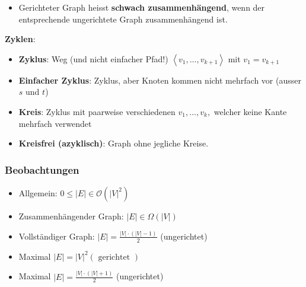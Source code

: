 \begin{sectionbox}
\begin{itemize}
    \item Gerichteter Graph heisst \textbf{schwach zusammenhängend}, wenn der entsprechende ungerichtete Graph zusammenhängend ist.
\end{itemize}\par\smallskip
\textbf{Zyklen}:\par
\begin{itemize}
    \item \textbf{Zyklus}: Weg (und nicht einfacher Pfad!) $\left\langle v_{1}, \ldots, v_{k+1}\right\rangle$ mit $v_{1}=v_{k+1}$
    \item \textbf{Einfacher Zyklus}: Zyklus, aber Knoten kommen nicht mehrfach vor (ausser $s$ und $t$)
    \item \textbf{Kreis}: Zyklus mit paarweise verschiedenen $v_{1}, \ldots, v_{k},$ welcher keine Kante mehrfach verwendet
    \item \textbf{Kreisfrei (azyklisch)}: Graph ohne jegliche Kreise.
\end{itemize}\par\vspace{7px}

\subsubsection{Beobachtungen}\par
\begin{itemize}
    \item Allgemein: $0 \leq|E| \in \mathcal{O}\left(|V|^{2}\right)$
    \item Zusammenhängender Graph: $|E| \in \Omega(|V|)$
    \item Vollständiger Graph: $|E|=\frac{|V| \cdot(|V|-1)}{2}$ (ungerichtet)
    \item Maximal $|E|=|V|^{2}(\text { gerichtet })$
    \item Maximal $|E|=\frac{|V| \cdot(|V|+1)}{2}$ (ungerichtet)
\end{itemize}\par\smallskip
\end{sectionbox}

\vspace{100px}

